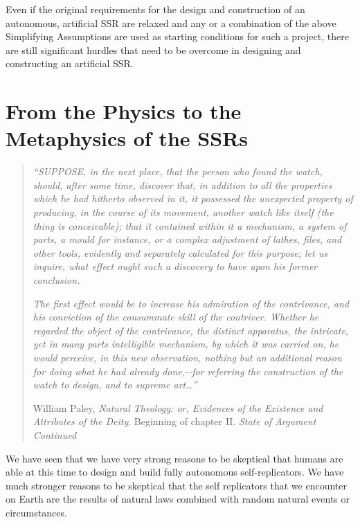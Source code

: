 Even if the original requirements for the design and construction of an
autonomous, artificial SSR are relaxed and any or a combination of the
above Simplifying Assumptions are used as starting conditions for such
a project, there are still significant hurdles that need to be overcome
in designing and constructing an artificial SSR.

\section{From the Physics to the Metaphysics of the SSRs}

\begin{quote}

\textit{“SUPPOSE, in the next place, that the person who found the
watch, should, after some time, discover that, in addition to all the
properties which he had hitherto observed in it, it possessed the
unexpected property of producing, in the course of its movement,
another watch like itself (the thing is conceivable); that it contained
within it a mechanism, a system of parts, a mould for instance, or a
complex adjustment of lathes, files, and other tools, evidently and
separately calculated for this purpose; let us inquire, what effect
ought such a discovery to have upon his former conclusion.}

\textit{The first effect would be to increase his admiration of the
contrivance, and his conviction of the consummate skill of the
contriver. Whether he regarded the object of the contrivance, the
distinct apparatus, the intricate, yet in many parts intelligible
mechanism, by which it was carried on, he would perceive, in this new
observation, nothing but an additional reason for doing what he had
already done,-{}-for referring the construction of the watch to design,
and to supreme art…”}

William Paley, \textit{Natural Theology: or, Evidences of the Existence
and Attributes of the Deity}. Beginning of chapter II. \textit{State of
Argument Continued}%
\end{quote}

We have seen that we have very strong reasons to be skeptical that
humans are able at this time to design and build fully autonomous
self-replicators. We have much stronger reasons to be skeptical that
the self replicators that we encounter on Earth are the results of
natural laws combined with random natural events or circumstances.

